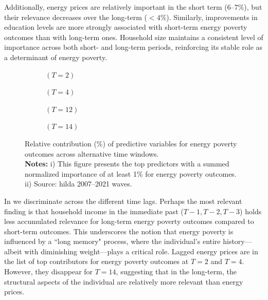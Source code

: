 \documentclass[preprint,authoryear,12pt]{elsarticle}
\begin{document}
Additionally, energy prices are relatively important in the short term (6--7\%), but their relevance decreases over the long-term ($<4$\%). Similarly, improvements in education levels are more strongly associated with short-term energy poverty outcomes than with long-term ones. Household size maintains a consistent level of importance across both short- and long-term periods, reinforcing its stable role as a determinant of energy poverty. 

\begin{figure}
     \centering
     \begin{subfigure}[b]{0.45\textwidth}
         \centering
         \resizebox{\textwidth}{!}{}
         \caption{$(T=2)$}
     \end{subfigure}
     \hfill
     \begin{subfigure}[b]{0.45\textwidth}
         \centering
         \resizebox{\textwidth}{!}{}
         \caption{$(T=4)$}
     \end{subfigure}
     \hfill
     \begin{subfigure}[b]{0.45\textwidth}
         \centering
         \resizebox{\textwidth}{!}{}
         \caption{$(T=12)$}
     \end{subfigure}
     \hfill
     \begin{subfigure}[b]{0.45\textwidth}
         \centering
         \resizebox{\textwidth}{!}{}
         \caption{$(T=14)$}
     \end{subfigure}
        \caption{Relative contribution (\%) of predictive variables for energy poverty outcomes across alternative time windows. \\
        \small
        {\bf Notes:} i) This figure presents the top predictors with a summed normalized importance of at least 1\% for energy poverty outcomes. ii) Source: \Gls{hilda} 2007--2021 waves.}
        \label{fig:figure5}
\end{figure}

In  we discriminate across the different time lags. Perhaps the most relevant finding is that household income in the immediate past ($T-1, T-2, T-3$) holds less accumulated relevance for long-term energy poverty outcomes compared to short-term outcomes. This underscores the notion that energy poverty is influenced by a ``long memory" process, where the individual's entire history—albeit with diminishing weight—plays a critical role. Lagged energy prices are in the list of top contributors for energy poverty outcomes at $T=2$ and $T=4$. However, they disappear for $T=14$, suggesting that in the long-term, the structural aspects of the individual are relatively more relevant than energy prices. 
\end{document}
